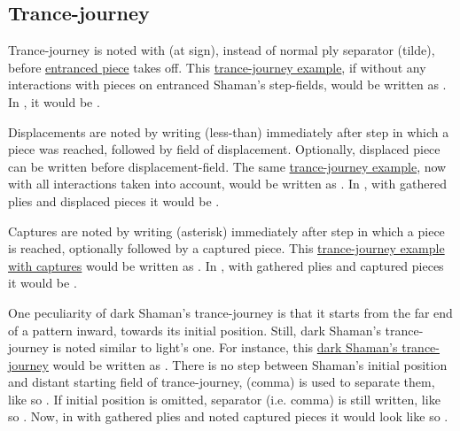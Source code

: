 \subsection*{Trance-journey}
\label{sec:Appendix/Notation/Trance-journey}

Trance-journey is noted with  (at sign), instead of normal ply separator \alg{\~{}}
(tilde), before \hyperref[fig:scn_cot_42_entrancement_step]{entranced piece} takes off. This
\hyperref[fig:scn_cot_56_light_light_shaman_interaction_start]{trance-journey example},
if without any interactions with pieces on entranced Shaman's step-fields, would be written
as . In , it would be .

Displacements are noted by writing \alg{<} (less-than) immediately after step in which a
piece was reached, followed by field of displacement. Optionally, displaced piece can be
written before displacement-field. The same
\hyperref[fig:scn_cot_57_light_light_shaman_interaction_end]{trance-journey example},
now with all interactions taken into account, would be written as
.
In , with gathered plies and displaced pieces it would be \newline
{}.

Captures are noted by writing \alg{*} (asterisk) immediately after step in which a piece
is reached, optionally followed by a captured piece. This
\hyperref[fig:scn_cot_59_dark_light_shaman_interaction_end]{trance-journey example with captures}
would be written as \newline
{}. In , with gathered plies and
captured pieces it would be \newline
{}.

One peculiarity of dark Shaman's trance-journey is that it starts from the far end
of a pattern inward, towards its initial position. Still, dark Shaman's trance-journey
is noted similar to light's one. For instance, this
\hyperref[fig:scn_cot_60_dark_dark_shaman_interaction_start]{dark Shaman's trance-journey}
would be written as .
There is no step between Shaman's initial position and distant starting field of
trance-journey, \alg{,} (comma) is used to separate them, like so
.
If initial position is omitted, separator (i.e. comma) is still written, like so
. Now, in  with gathered plies
and noted captured pieces it would look like so \newline
{}.

